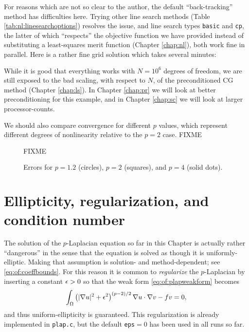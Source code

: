 For reasons which are not so clear to the author, the default ``back-tracking'' method has difficulties here.  Trying other line search methods (Table \ref{tab:nl:linesearchoptions}) resolves the issue, and line search types \texttt{basic} and \texttt{cp}, the latter of which ``respects'' the objective function we have provided instead of substituting a least-squares merit function (Chapter \ref{chap:nl}), both work fine in parallel.  Here is a rather fine grid solution which takes several minutes:
While it is good that everything works with $N=10^6$ degrees of freedom, we are still exposed to the bad scaling, with respect to $N$, of the preconditioned CG method (Chapter \ref{chap:ls}).  In Chapter \ref{chap:pr} we will look at better preconditioning for this example, and in Chapter \ref{chap:sc} we will look at larger processor-counts.

We should also compare convergence for different $p$ values, which represent different degrees of nonlinearity relative to the $p=2$ case.  FIXME

\begin{figure}
FIXME %
\caption{Errors for $p=1.2$ (circles), $p=2$ (squares), and $p=4$ (solid dots).}
\label{fig:of:plap-presults}
\end{figure}


\section{Ellipticity, regularization, and condition number}  \label{page:of:regularization}

The solution of the $p$-Laplacian equation so far in this Chapter is actually rather ``dangerous'' in the sense that the equation is solved as though it is uniformly-elliptic.  Making that assumption is solution- and method-dependent; see \eqref{eq:of:coeffbounds}.  For this reason it is common to \emph{regularize} the $p$-Laplacian by inserting a constant $\epsilon>0$ so that the weak form \eqref{eq:of:plapweakform} becomes
\begin{equation}
\int_\Omega \left(|\nabla u|^2+\epsilon^2\right)^{(p-2)/2} \nabla u \cdot \nabla v - f v = 0, \label{eq:of:plapweakformreg}
\end{equation}
and thus uniform-ellipticity is guaranteed.  This regularization is already implemented in \texttt{plap.c}, but the default \texttt{eps}$=0$ has been used in all runs so far.



